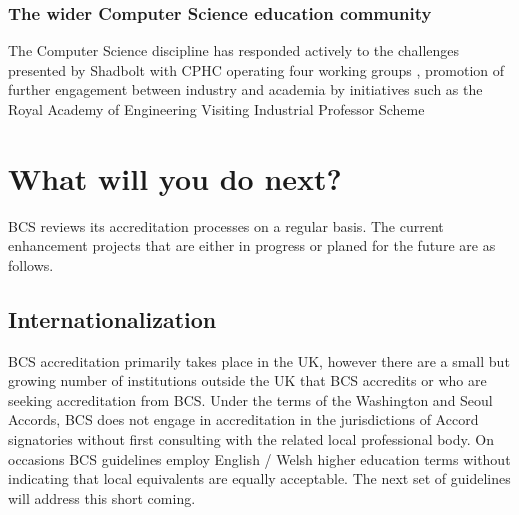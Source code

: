 \documentclass[sigconf]{acmart}
\begin{document}
\subsubsection{The wider Computer Science education community}
The Computer Science discipline has responded actively to the challenges presented by Shadbolt with CPHC operating four working groups \cite{cphc_2016},  promotion of further engagement between industry and academia by initiatives such as the Royal Academy of Engineering Visiting Industrial Professor Scheme \cite{royal}

\section {What will you do next?}	

BCS reviews its accreditation processes on a regular basis. The current enhancement projects that are either in progress or planed for the future are as follows.

\subsection{Internationalization}
BCS accreditation primarily takes place in the UK, however there are a small but growing number of institutions outside the UK that BCS accredits or who are seeking accreditation from BCS. Under the terms of the Washington and Seoul Accords, BCS does not engage in accreditation in the jurisdictions of Accord signatories without first consulting with the related local professional body.  On occasions BCS guidelines employ English / Welsh higher education terms without indicating that local equivalents are equally acceptable. The next set of guidelines will address this short coming.
\end{document}
